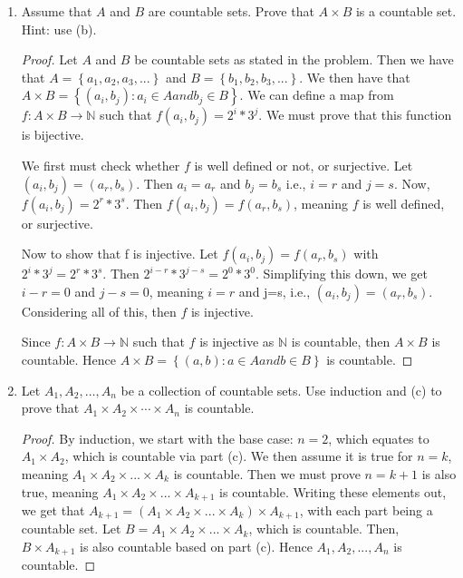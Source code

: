 \documentclass[10pt]{article}
\begin{document}
\begin{enumerate}
\begin{enumerate}
	\item  Assume that $A$ and $B$ are countable sets.  Prove that $A \times B$ is a countable set.  Hint: use (b).
\begin{proof}
Let $A$ and $B$ be countable sets as stated in the problem.  Then we have that $A = \left\{a_1,a_2,a_3,...\right\}$ and $B = \left\{b_1,b_2,b_3,...\right\}$.  We then have that $A \times B = \left\{(a_i,b_j):a_i  \in A and b_j  \in B\right\}$.  We can define a map from $f:A \times B \rightarrow \mathbb{N}$ such that $f(a_i,b_j)=2^i*3^j$.  We must prove that this function is bijective.
\par \medskip
We first must check whether $f$ is well defined or not, or surjective. Let $(a_i,b_j) = (a_r,b_s)$.  Then $a_i=a_r$ and $b_j=b_s$ i.e., $i=r$ and $j=s$. Now, $f(a_i,b_j )=2^r*3^s$.  Then $f(a_i,b_j )=f(a_r,b_s)$, meaning $f$ is well defined, or surjective.  
\par \medskip
Now to show that f is injective.  Let $f(a_i,b_j )=f(a_r,b_s)$ with $2^i*3^j=2^r*3^s$.  Then $2^{i-r}*3^{j-s}=2^0*3^0$.  Simplifying this down, we get $i-r=0$ and $j-s=0$, meaning $i=r$ and j=s, i.e., $(a_i,b_j )=(a_r,b_s)$.  Considering all of this, then $f$ is injective.

Since $f:A \times B \rightarrow \mathbb{N}$ such that $f$ is injective as $\mathbb{N}$ is countable, then $A \times B$ is countable.  Hence $A \times B = \left\{(a,b): a \in A and b \in B\right\}$ is countable.
\end{proof}
	\item  Let $A_1, A_2, \ldots, A_n$ be a collection of countable sets.  Use induction and (c) to prove that $A_1 \times A_2 \times \cdots \times A_n$ is countable.
 \begin{proof}
By induction, we start with the base case: $n = 2$, which equates to $A_1 \times A_2$, which is countable via part (c).  We then assume it is true for $n = k$, meaning $A_1 \times A_2 \times ... \times A_k$ is countable.  Then we must prove $n = k+1$ is also true, meaning $A_1 \times A_2 \times ... \times A_{k+1}$ is countable.  Writing these elements out, we get that $A_{k+1}=(A_1 \times A_2 \times ... \times A_k)\times A_{k+1}$, with each part being a countable set.  Let $B=A_1 \times A_2 \times ... \times A_k$, which is countable.  Then, $B \times A_{k+1}$ is also countable based on part (c).  Hence $A_1,A_2,...,A_n$ is countable. 
\end{proof}
	
	\end{enumerate}
	

\end{enumerate}
\end{document}
